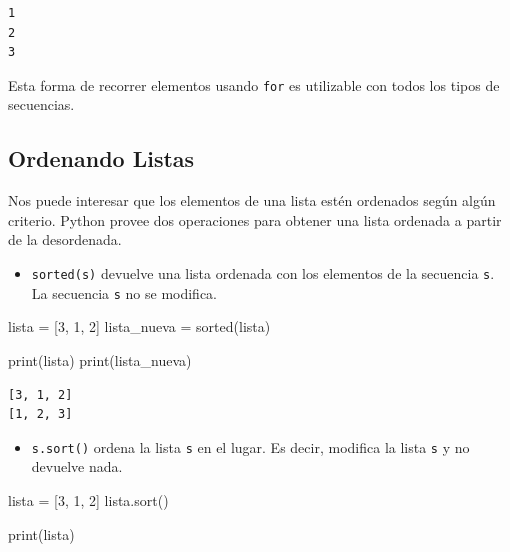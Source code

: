 \documentclass[
  letterpaper,
  DIV=11,
  numbers=noendperiod]{scrreprt}
\newenvironment{Shaded}{\begin{snugshade}}{\end{snugshade}}
\newcommand{\BuiltInTok}[1]{\textcolor[rgb]{0.00,0.23,0.31}{#1}}
\newcommand{\DecValTok}[1]{\textcolor[rgb]{0.68,0.00,0.00}{#1}}
\newcommand{\NormalTok}[1]{\textcolor[rgb]{0.00,0.23,0.31}{#1}}
\newcommand{\OperatorTok}[1]{\textcolor[rgb]{0.37,0.37,0.37}{#1}}
\providecommand{\tightlist}{%
  \setlength{\itemsep}{0pt}\setlength{\parskip}{0pt}}\usepackage{longtable,booktabs,array}
\begin{document}
\begin{verbatim}
1
2
3
\end{verbatim}

Esta forma de recorrer elementos usando \texttt{for} es utilizable con
todos los tipos de secuencias.

\subsection{Ordenando Listas}\label{ordenando-listas}

Nos puede interesar que los elementos de una lista estén ordenados según
algún criterio. Python provee dos operaciones para obtener una lista
ordenada a partir de la desordenada.

\begin{itemize}
\tightlist
\item
  \texttt{sorted(s)} devuelve una lista ordenada con los elementos de la
  secuencia \texttt{s}. La secuencia \texttt{s} no se modifica.
\end{itemize}

\begin{Shaded}
\begin{Highlighting}[]
\NormalTok{lista }\OperatorTok{=}\NormalTok{ [}\DecValTok{3}\NormalTok{, }\DecValTok{1}\NormalTok{, }\DecValTok{2}\NormalTok{]}
\NormalTok{lista\_nueva }\OperatorTok{=} \BuiltInTok{sorted}\NormalTok{(lista)}

\BuiltInTok{print}\NormalTok{(lista)}
\BuiltInTok{print}\NormalTok{(lista\_nueva)}
\end{Highlighting}
\end{Shaded}

\begin{verbatim}
[3, 1, 2]
[1, 2, 3]
\end{verbatim}

\begin{itemize}
\tightlist
\item
  \texttt{s.sort()} ordena la lista \texttt{s} en el lugar. Es decir,
  modifica la lista \texttt{s} y no devuelve nada.
\end{itemize}

\begin{Shaded}
\begin{Highlighting}[]
\NormalTok{lista }\OperatorTok{=}\NormalTok{ [}\DecValTok{3}\NormalTok{, }\DecValTok{1}\NormalTok{, }\DecValTok{2}\NormalTok{]}
\NormalTok{lista.sort()}

\BuiltInTok{print}\NormalTok{(lista)}
\end{Highlighting}
\end{Shaded}
\end{document}

